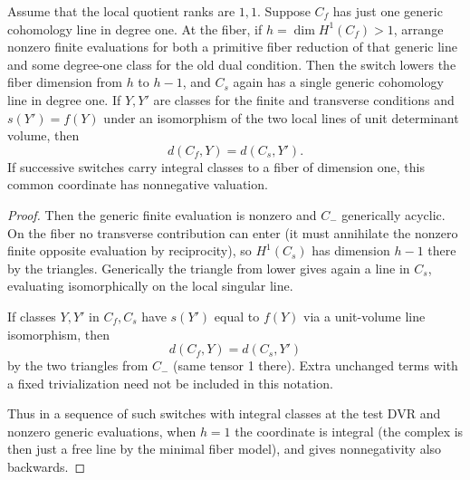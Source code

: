 \begin{lemma}\label{lem:foundations-line}
Assume that the local quotient ranks are \(1,1\). Suppose \(C_f\) has just one generic cohomology line in degree one. At the fiber, if \(h=\dim H^1(C_f)>1\), arrange nonzero finite evaluations for both a primitive fiber reduction of that generic line and some degree-one class for the old dual condition. Then the switch lowers the fiber dimension from \(h\) to \(h-1\), and \(C_s\) again has a single generic cohomology line in degree one. If \(Y,Y'\) are classes for the finite and transverse conditions and \(s(Y')=f(Y)\) under an isomorphism of the two local lines of unit determinant volume, then
\[
 d(C_f,Y)=d(C_s,Y').
\]
If successive switches carry integral classes to a fiber of dimension one, this common coordinate has nonnegative valuation.
\end{lemma}

\begin{proof}
Then the generic finite evaluation is nonzero and \(C_-\) generically acyclic. On the fiber no transverse contribution can enter (it must annihilate the nonzero finite opposite evaluation by reciprocity), so \(H^1(C_s)\) has dimension \(h-1\) there by the triangles. Generically the triangle from lower gives again a line in \(C_s\), evaluating isomorphically on the local singular line.

If classes \(Y,Y'\) in \(C_f,C_s\) have \(s(Y')\) equal to \(f(Y)\) via a unit-volume line isomorphism, then
\[
                          d(C_f,Y)=d(C_s,Y')
\]
by the two triangles from \(C_-\) (same tensor 1 there). Extra unchanged terms with a fixed trivialization need not be included in this notation.

Thus in a sequence of such switches with integral classes at the test DVR and nonzero generic evaluations, when \(h=1\) the coordinate is integral (the complex is then just a free line by the minimal fiber model), and gives nonnegativity also backwards.
\end{proof}

